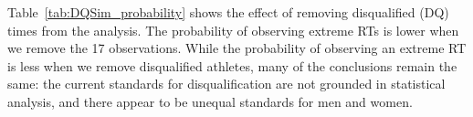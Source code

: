 \documentclass[12pt, letterpaper]{article}
\begin{document}
Table~\ref{tab:DQSim_probability} shows the effect of removing disqualified (DQ)
times from the analysis.  The probability of observing extreme RTs is lower when
we remove the 17 observations.  While the probability of observing an extreme
RT is less when we remove disqualified athletes, many of the 
conclusions remain the same: the current standards for disqualification are not
grounded in statistical analysis, and there appear to be unequal standards for men
and women.



\end{document}
